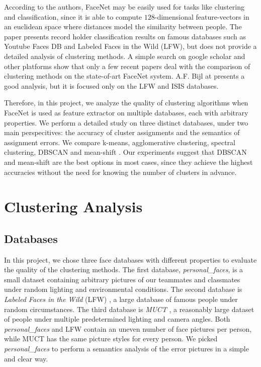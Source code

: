 \documentclass[conference]{IEEEtran}
\begin{document}
According to the authors, FaceNet may be easily used for tasks like clustering and classification, since it is able to compute $128$-dimensional feature-vectors in an euclidean space where distances model the similarity between people.
The paper presents record holder classification results on famous databases such as Youtube Faces DB and Labeled Faces in the Wild (LFW), but
does not provide a detailed analysis of clustering methods.
A simple search on google scholar and other platforms show that only a few recent papers deal with the comparison of clustering methods on the state-of-art FaceNet system.
A.F. Bijl at \cite{??} presents a good analysis, but it is focused only on the LFW and ISIS databases.

Therefore, in this project, we analyze the quality of clustering algorithms when FaceNet is used as feature extractor on multiple databases, each with arbitrary properties.
We perform a detailed study on three distinct databases, under two main perspecitives: the accuracy of cluster assignments and the semantics of assignment errors.
We compare k-means, agglomerative clustering, spectral clustering, DBSCAN and mean-shift \cite{??}.
Our experiments suggest that DBSCAN and mean-shift are the best options in most cases, since they achieve the highest accuracies without the need for knowing the number of clusters in advance.

\section{Clustering Analysis}

\subsection{Databases}

In this project, we chose three face databases with different properties to evaluate the quality of the clustering methods.
The first database, \textit{personal\_faces}, is a small dataset containing arbitrary pictures of our teammates and classmates under random lighting and environmental conditions.
The second database is \textit{Labeled Faces in the Wild} (LFW) \cite{??}, a large database of famous people under random circumstances.
The third database is \textit{MUCT} \cite{??}, a reasonably large dataset of people under multiple predetermined lighting and camera angles.
Both \textit{personal\_faces} and LFW contain an uneven number of face pictures per person, while MUCT has the same picture styles for every person.
We picked \textit{personal\_faces} to perform a semantics analysis of the error pictures in a simple and clear way.
\end{document}
